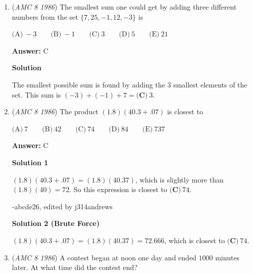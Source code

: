 \begin{enumerate}
 \textbf{Answer: }A



\textbf{Solution 1}

Smaller positive real numbers have larger reciprocals.  Of these numbers, $\boxed{\textbf{(A)}\ \frac{1}{3} }$ is the smallest.

 



\textbf{Solution 2}

The reciprocals of the answer choices are $3$, $2\frac{1}{2}$, $1$, $\frac{1}{5}$, and $\frac{1}{1986}$.  Since $3$ is the largest, $\boxed{\textbf{(A)}\ \frac{1}{3} }$ is correct.

 


	\item (\textit{AMC 8 1986}) The smallest sum one could get by adding three different numbers from the set $\{ 7,25,-1,12,-3 \}$ is


 $\text{(A)}\ -3 \qquad \text{(B)}\ -1 \qquad \text{(C)}\ 3 \qquad \text{(D)}\ 5 \qquad \text{(E)}\ 21$

 \textbf{Answer: }C



\textbf{Solution}

The smallest possible sum is found by adding the $3$ smallest elements of the set.  This sum is  $(-3)+ (-1) + 7 = \boxed{\textbf{(C)}\ 3}$.

 


	\item (\textit{AMC 8 1986}) The product $(1.8)(40.3+.07)$ is closest to 


 $\text{(A)}\ 7 \qquad \text{(B)}\ 42 \qquad \text{(C)}\ 74 \qquad \text{(D)}\ 84 \qquad \text{(E)}\ 737$

 \textbf{Answer: }C



\textbf{Solution 1}

$(1.8)(40.3 + .07) = (1.8)(40.37)$, which is slightly more than $(1.8)(40) = 72$. So this expression is closest to $\boxed{\textbf{(C)}\ 74}$.

 -abcde26, edited by j314andrews

 



\textbf{Solution 2 (Brute Force)}

$(1.8)(40.3 + .07) = (1.8)(40.37) = 72.666$, which is closest to $\boxed{\textbf{(C)}\ 74}$.

 


	\item (\textit{AMC 8 1986}) A contest began at noon one day and ended $1000$ minutes later.  At what time did the contest end?



\end{enumerate}
